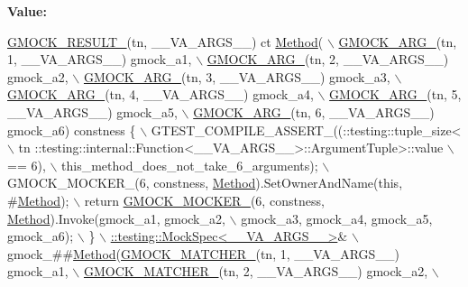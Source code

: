 {\bfseries Value\+:}
\begin{DoxyCode}
\hyperlink{gmock-generated-function-mockers_8h_a0e9d94e9c77df84f1103af06feee1077}{GMOCK\_RESULT\_}(tn, \_\_VA\_ARGS\_\_) ct \hyperlink{gmock-spec-builders__test_8cc_a95606368148f3e5aab5db46c32466afd}{Method}( \(\backslash\)
      \hyperlink{gmock-generated-function-mockers_8h_a887575cc1c31158fba808180a10c004f}{GMOCK\_ARG\_}(tn, 1, \_\_VA\_ARGS\_\_) gmock\_a1, \(\backslash\)
      \hyperlink{gmock-generated-function-mockers_8h_a887575cc1c31158fba808180a10c004f}{GMOCK\_ARG\_}(tn, 2, \_\_VA\_ARGS\_\_) gmock\_a2, \(\backslash\)
      \hyperlink{gmock-generated-function-mockers_8h_a887575cc1c31158fba808180a10c004f}{GMOCK\_ARG\_}(tn, 3, \_\_VA\_ARGS\_\_) gmock\_a3, \(\backslash\)
      \hyperlink{gmock-generated-function-mockers_8h_a887575cc1c31158fba808180a10c004f}{GMOCK\_ARG\_}(tn, 4, \_\_VA\_ARGS\_\_) gmock\_a4, \(\backslash\)
      \hyperlink{gmock-generated-function-mockers_8h_a887575cc1c31158fba808180a10c004f}{GMOCK\_ARG\_}(tn, 5, \_\_VA\_ARGS\_\_) gmock\_a5, \(\backslash\)
      \hyperlink{gmock-generated-function-mockers_8h_a887575cc1c31158fba808180a10c004f}{GMOCK\_ARG\_}(tn, 6, \_\_VA\_ARGS\_\_) gmock\_a6) constness \{ \(\backslash\)
    GTEST\_COMPILE\_ASSERT\_((::testing::tuple\_size<                          \(\backslash\)
        tn ::testing::internal::Function<\_\_VA\_ARGS\_\_>::ArgumentTuple>::value \(\backslash\)
            == 6), \(\backslash\)
        this\_method\_does\_not\_take\_6\_arguments); \(\backslash\)
    GMOCK\_MOCKER\_(6, constness, \hyperlink{gmock-spec-builders__test_8cc_a95606368148f3e5aab5db46c32466afd}{Method}).SetOwnerAndName(\textcolor{keyword}{this}, #\hyperlink{gmock-spec-builders__test_8cc_a95606368148f3e5aab5db46c32466afd}{Method}); \(\backslash\)
    return \hyperlink{gmock-generated-function-mockers_8h_a7d362499e27b1bc3a9806dd3cf58a5b7}{GMOCK\_MOCKER\_}(6, constness, \hyperlink{gmock-spec-builders__test_8cc_a95606368148f3e5aab5db46c32466afd}{Method}).Invoke(gmock\_a1, gmock\_a2, \(\backslash\)
        gmock\_a3, gmock\_a4, gmock\_a5, gmock\_a6); \(\backslash\)
  \} \(\backslash\)
  \hyperlink{classtesting_1_1internal_1_1_mock_spec}{::testing::MockSpec<\_\_VA\_ARGS\_\_>}& \(\backslash\)
      gmock\_##\hyperlink{gmock-spec-builders__test_8cc_a95606368148f3e5aab5db46c32466afd}{Method}(\hyperlink{gmock-generated-function-mockers_8h_aa87d0009fe91f1c89d658776b55a769c}{GMOCK\_MATCHER\_}(tn, 1, \_\_VA\_ARGS\_\_) gmock\_a1, \(\backslash\)
                     \hyperlink{gmock-generated-function-mockers_8h_aa87d0009fe91f1c89d658776b55a769c}{GMOCK\_MATCHER\_}(tn, 2, \_\_VA\_ARGS\_\_) gmock\_a2, \(\backslash\)

\end{DoxyCode}
